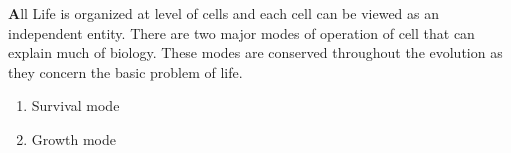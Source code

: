 \textbf
All Life is organized at level of cells and each cell can be viewed as an independent entity. There are two major modes of operation of cell that can explain much of biology. These modes are conserved throughout the evolution as they concern the basic problem of life.
\begin{enumerate}
\item Survival mode
\item Growth mode
\end{enumerate}